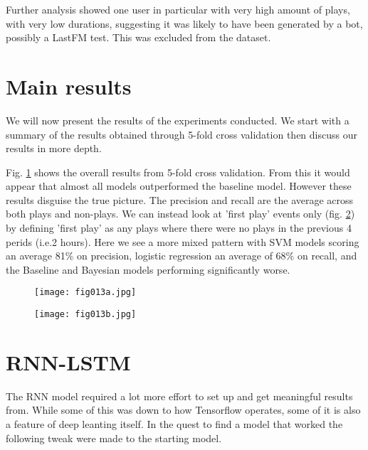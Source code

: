\newpage

Further analysis showed one user in particular with very high amount of plays, with very low durations, suggesting it was likely to have been generated by a bot, possibly a LastFM test. This was excluded from the dataset.

\section{Main results} %

We will now present the results of the experiments conducted. We start with a summary of the results obtained through 5-fold cross validation then discuss our results in more depth.

Fig. \ref{fig13a} shows the overall results from 5-fold cross validation. From this it would appear that almost all models outperformed the baseline model. However these results disguise the true picture. The precision and recall are the average across both plays and non-plays.  We can instead look at 'first play' events only (fig. \ref{fig13b}) by defining 'first play' as any plays where there were no plays in the previous 4 perids (i.e.2 hours). Here we see a more mixed pattern with SVM models scoring an average 81\% on precision, logistic regression an average of 68\% on recall, and the Baseline and Bayesian models performing significantly worse. 

\begin{figure}[h!]
	\centering
	\texttt{[image: fig013a.jpg]}
	\caption{}
	\label{fig13a}
\end{figure} 

 
 
\begin{figure}[h!]
	\centering
	\texttt{[image: fig013b.jpg]}
	\caption{}
	\label{fig13b}
\end{figure}  



\section{RNN-LSTM}

The RNN model required a lot more effort to set up and get meaningful results from. While some of this was down to how Tensorflow operates, some of it is also a feature of deep leanting itself. In the quest to find a model that worked the following tweak were made to the starting model.

